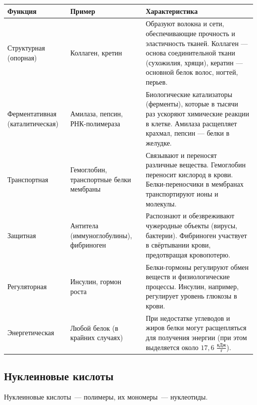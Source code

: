 \documentclass[12pt]{article}
\begin{document}
	\begin{xltabular}{\textwidth}{|X|X|X|}
		\hline
		Функция & Пример & Характеристика\\
		\hline
		Структурная (опорная) & Коллаген, кретин & Образуют волокна и сети, обеспечивающие прочность и эластичность тканей. Коллаген — основа соединительной ткани (сухожилия, хрящи), кератин — основной белок волос, ногтей, перьев.\\
		\hline
		Ферментативная (каталитическая) & Амилаза, пепсин, РНК-полимераза & Биологические катализаторы (ферменты), которые в тысячи раз ускоряют химические реакции в клетке. Амилаза расщепляет крахмал, пепсин — белки в желудке.\\
		\hline
		Транспортная & Гемоглобин, транспортные белки мембраны & Связывают и переносят различные вещества. Гемоглобин переносит кислород в крови. Белки-переносчики в мембранах транспортируют ионы и молекулы.\\
		\hline
		Защитная & Антитела (иммуноглобулины), фибриноген & Распознают и обезвреживают чужеродные объекты (вирусы, бактерии). Фибриноген участвует в свёртывании крови, предотвращая кровопотерю.\\
		\hline
		Регуляторная & Инсулин, гормон роста & Белки-гормоны регулируют обмен веществ и физиологические процессы. Инсулин, например, регулирует уровень глюкозы в крови.\\
		\hline
		Энергетическая & Любой белок (в крайних случаях) & При недостатке углеводов и жиров белки могут расщепляться для получения энергии (при этом выделяется около $17,6$ $\frac{\text{кДж}}{\text{г}}$).\\
		\hline
	\end{xltabular}
	\subsection{Нуклеиновые кислоты}
	Нуклеиновые кислоты~--- полимеры, их мономеры~--- нуклеотиды.
\end{document}
